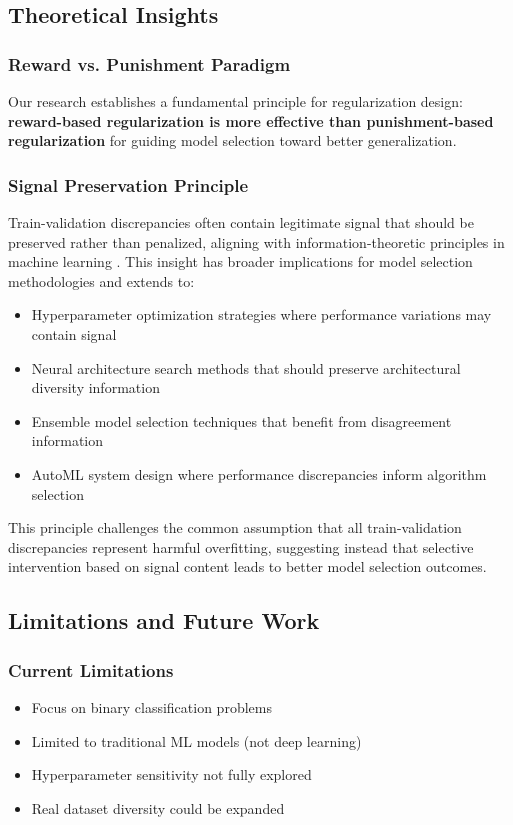 \documentclass[11pt,twocolumn]{article}
\begin{document}
\subsection{Theoretical Insights}

\subsubsection{Reward vs. Punishment Paradigm}
Our research establishes a fundamental principle for regularization design: \textbf{reward-based regularization is more effective than punishment-based regularization} for guiding model selection toward better generalization.

\subsubsection{Signal Preservation Principle}
Train-validation discrepancies often contain legitimate signal that should be preserved rather than penalized, aligning with information-theoretic principles in machine learning \cite{hastie2009elements}. This insight has broader implications for model selection methodologies \cite{arlot2010survey} and extends to:
\begin{itemize}
    \item Hyperparameter optimization strategies where performance variations may contain signal
    \item Neural architecture search methods that should preserve architectural diversity information
    \item Ensemble model selection techniques that benefit from disagreement information \cite{breiman2001random}
    \item AutoML system design where performance discrepancies inform algorithm selection
\end{itemize}

This principle challenges the common assumption that all train-validation discrepancies represent harmful overfitting, suggesting instead that selective intervention based on signal content leads to better model selection outcomes.

\subsection{Limitations and Future Work}

\subsubsection{Current Limitations}
\begin{itemize}
    \item Focus on binary classification problems
    \item Limited to traditional ML models (not deep learning)
    \item Hyperparameter sensitivity not fully explored
    \item Real dataset diversity could be expanded
\end{itemize}
\end{document}
